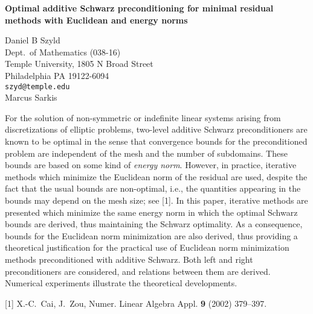 \documentclass{report}
\begin{document}

\begin{center}
{\large
{\bf Optimal additive Schwarz preconditioning for minimal residual \\
	methods with Euclidean and energy norms}}

	Daniel B Szyld \\
	Dept.~of Mathematics (038-16) \\
	Temple University, 1805 N Broad Street \\
	Philadelphia PA 19122-6094 \\
	{\tt szyd@temple.edu} \\
	Marcus Sarkis
\end{center}
For the solution of non-symmetric or indefinite linear
systems arising from discretizations of elliptic problems,
two-level additive Schwarz preconditioners are known to be
optimal in the sense that convergence bounds for the
preconditioned problem are independent of the mesh and the
number of subdomains. These bounds are based on some kind of
{\em energy norm}. However, in practice, iterative methods
which minimize the Euclidean norm of the residual are used,
despite the fact that the usual bounds are non-optimal,
i.e., the quantities appearing in the bounds may depend on
the mesh size; see [1].
In this paper,
iterative methods are presented which minimize the same
energy norm in which the optimal Schwarz bounds are derived,
thus maintaining the Schwarz optimality. As a consequence,
bounds for the Euclidean norm minimization are also derived,
thus providing a theoretical justification for the practical
use of Euclidean norm minimization methods preconditioned
with additive Schwarz. Both left and right preconditioners
are considered, and relations between them are derived.
Numerical experiments illustrate the theoretical
developments.

[1] X.-C.~Cai, J.~Zou,
Numer. Linear Algebra Appl. {\bf 9} (2002) 379--397.



\end{document}
